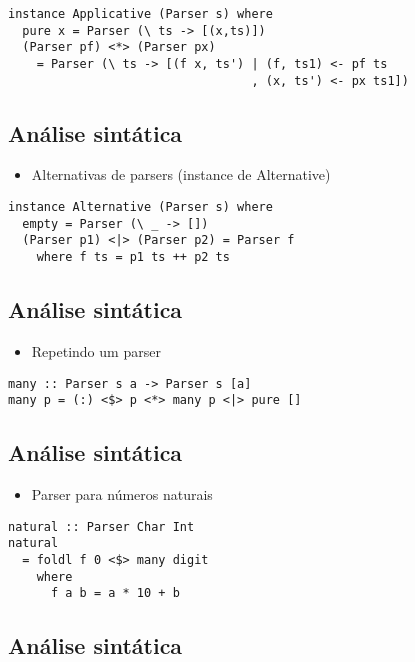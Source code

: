 \documentclass[11pt]{article}
\begin{document}
\begin{verbatim}
instance Applicative (Parser s) where 
  pure x = Parser (\ ts -> [(x,ts)])
  (Parser pf) <*> (Parser px)
    = Parser (\ ts -> [(f x, ts') | (f, ts1) <- pf ts
                                  , (x, ts') <- px ts1])
\end{verbatim}
\subsection*{Análise sintática}
\label{sec:org30a67f3}

\begin{itemize}
\item Alternativas de parsers (instance de Alternative)
\end{itemize}

\begin{verbatim}
instance Alternative (Parser s) where 
  empty = Parser (\ _ -> [])
  (Parser p1) <|> (Parser p2) = Parser f 
    where f ts = p1 ts ++ p2 ts
\end{verbatim}
\subsection*{Análise sintática}
\label{sec:orgea93aa4}

\begin{itemize}
\item Repetindo um parser
\end{itemize}

\begin{verbatim}
many :: Parser s a -> Parser s [a]
many p = (:) <$> p <*> many p <|> pure []
\end{verbatim}
\subsection*{Análise sintática}
\label{sec:org6eda6cf}

\begin{itemize}
\item Parser para números naturais
\end{itemize}

\begin{verbatim}
natural :: Parser Char Int 
natural 
  = foldl f 0 <$> many digit  
    where 
      f a b = a * 10 + b 
\end{verbatim}
\subsection*{Análise sintática}
\label{sec:org3882776}
\end{document}
